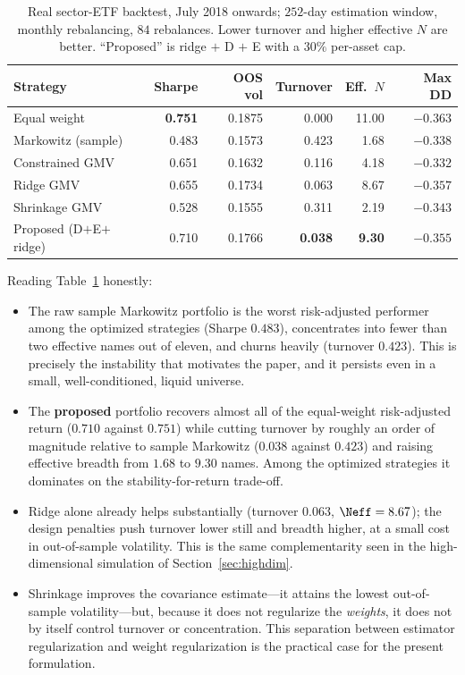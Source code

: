 \begin{table}[htbp]
\centering
\caption{Real sector-ETF backtest, July 2018 onwards; $252$-day estimation
  window, monthly rebalancing, $84$ rebalances. Lower turnover and higher
  effective $N$ are better. ``Proposed'' is ridge $+$ D $+$ E with a $30\%$
  per-asset cap.}
\label{tab:real}
\begin{tabular}{lrrrrr}
\toprule
\textbf{Strategy} & \textbf{Sharpe} & \textbf{OOS vol} & \textbf{Turnover} & \textbf{Eff.\ $N$} & \textbf{Max DD} \\
\midrule
Equal weight             & \textbf{0.751} & 0.1875 & 0.000 & 11.00 & $-0.363$ \\
Markowitz (sample)       & 0.483 & 0.1573 & 0.423 & 1.68 & $-0.338$ \\
Constrained GMV          & 0.651 & 0.1632 & 0.116 & 4.18 & $-0.332$ \\
Ridge GMV                & 0.655 & 0.1734 & 0.063 & 8.67 & $-0.357$ \\
Shrinkage GMV            & 0.528 & 0.1555 & 0.311 & 2.19 & $-0.343$ \\
Proposed (D$+$E$+$ridge) & 0.710 & 0.1766 & \textbf{0.038} & \textbf{9.30} & $-0.355$ \\
\bottomrule
\end{tabular}
\end{table}

Reading Table~\ref{tab:real} honestly:

\begin{itemize}[leftmargin=1.4em,itemsep=0.25em]
  \item The raw sample Markowitz portfolio is the worst risk-adjusted performer
    among the optimized strategies (Sharpe $0.483$), concentrates into fewer than
    two effective names out of eleven, and churns heavily (turnover $0.423$).
    This is precisely the instability that motivates the paper, and it persists
    even in a small, well-conditioned, liquid universe.
  \item The \textbf{proposed} portfolio recovers almost all of the equal-weight
    risk-adjusted return ($0.710$ against $0.751$) while cutting turnover by
    roughly an order of magnitude relative to sample Markowitz ($0.038$ against
    $0.423$) and raising effective breadth from $1.68$ to $9.30$ names. Among the
    optimized strategies it dominates on the stability-for-return trade-off.
  \item Ridge alone already helps substantially (turnover $0.063$, $\Neff=8.67$);
    the design penalties push turnover lower still and breadth higher, at a small
    cost in out-of-sample volatility. This is the same complementarity seen in
    the high-dimensional simulation of Section~\ref{sec:highdim}.
  \item Shrinkage improves the covariance estimate---it attains the lowest
    out-of-sample volatility---but, because it does not regularize the
    \emph{weights}, it does not by itself control turnover or concentration.
    This separation between estimator regularization and weight regularization
    is the practical case for the present formulation.
\end{itemize}

